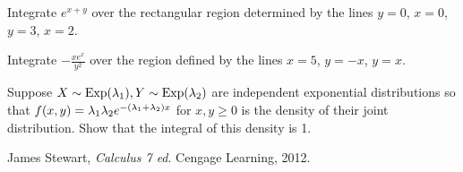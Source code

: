 \documentclass[11 pt]{scrartcl}
\begin{document}
\begin{exercise}
    Integrate $e^{x+y}$ over the rectangular region determined by the lines $y = 0$, $x = 0$, $y = 3$, $x = 2$. 
\end{exercise}
\begin{exercise}
    Integrate $-\frac{xe^x}{y^2}$ over the region defined by the lines $x = 5$, $y = -x$, $y = x$. 
\end{exercise} 
\begin{exercise}
    Suppose $X \sim \text{Exp}(\lambda_1), Y \sim \text{Exp}(\lambda_2)$ are independent exponential distributions so that $f(x,y) = \lambda_1\lambda_2 e^{-(\lambda_1+\lambda_2)x}$ for $x, y \geq 0$ is the density of their joint distribution. 
    Show that the integral of this density is 1. %
\end{exercise}



\begin{thebibliography}{12}
		James Stewart, \textit{Calculus 7 ed}. Cengage Learning, 2012. 
\end{thebibliography}
\end{document}
